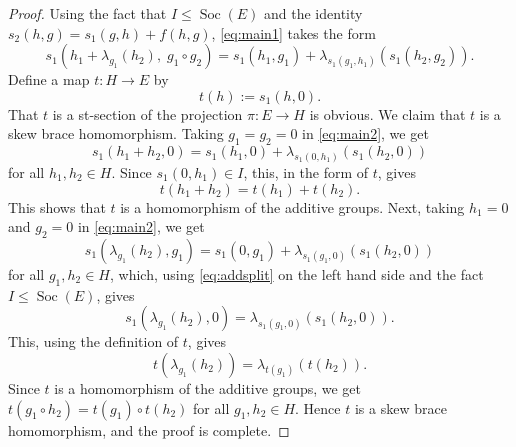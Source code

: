 \documentclass[10pt,a4paper]{amsart}
\newcommand{\Soc}{\operatorname{Soc} }
\begin{document}
\begin{proof}
	
Using the fact that $I \le \Soc(E)$ and the identity $s_2(h, g) = s_1(g, h) + f(h, g)$, \eqref{eq:main1} takes the form
	\begin{equation}\label{eq:main2}
		s_1(h_1 + \lambda_{g_1}(h_2),\; g_1 \circ g_2) = s_1(h_1, g_1) + \lambda_{s_1(g_1, h_1)}(s_1(h_2, g_2)).
	\end{equation}
Define a map \( t : H \to E \) by
	\[
	t(h) := s_1(h, 0).
	\]
	That $t$ is a st-section of the projection \( \pi : E \to H \) is obvious. We claim that \( t \) is a skew brace homomorphism. Taking  \( g_1 = g_2 = 0 \) in  \eqref{eq:main2}, we get
	$$s_1(h_1 + h_2, 0) = s_1(h_1, 0) + \lambda_{s_1(0, h_1)}(s_1(h_2, 0))$$
	for all  \( h_1, h_2 \in H \). 	Since \( s_1(0, h_1) \in I \), this, in the form of $t$, gives
	\[
	t(h_1 + h_2) = t(h_1) + t(h_2).
	\]
This shows that \( t \) is a homomorphism of the additive groups. Next, taking  \( h_1 = 0 \) and \( g_2 = 0 \) in \eqref{eq:main2}, we get
$$s_1(\lambda_{g_1}(h_2), g_1) = s_1(0, g_1) + \lambda_{s_1(g_1, 0)}(s_1(h_2, 0))$$
for all $g_1, h_2 \in H$, which,
	using  \eqref{eq:addsplit} on the left hand side and the fact $I \le \Soc(E)$, gives
	\[
	s_1(\lambda_{g_1}(h_2), 0) = \lambda_{s_1(g_1, 0)}(s_1(h_2, 0)).
	\]
	This, using the definition of $t$, gives 
	\[
	t(\lambda_{g_1}(h_2)) = \lambda_{t(g_1)}(t(h_2)).
	\]
Since $t$ is  a homomorphism of the additive groups, we get $t(g_1 \circ h_2) = t(g_1) \circ t(h_2)$ for all $g_1, h_2 \in H$. Hence $t$ is a skew brace homomorphism, and the proof is complete. 		
\end{proof}
\end{document}
